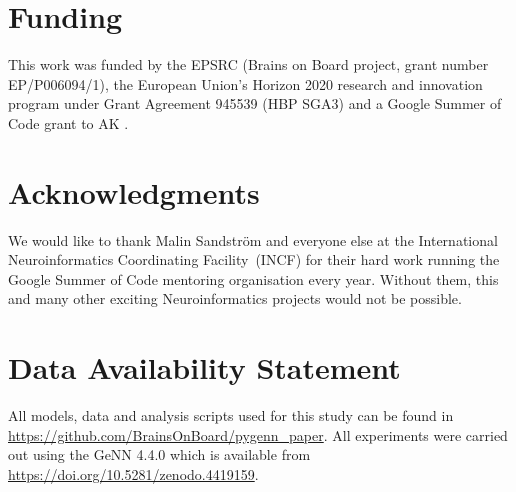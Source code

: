 \documentclass[utf8]{frontiersSCNS} %
\begin{document}
\section*{Funding}
This work was funded by the EPSRC (Brains on Board project, grant number EP/P006094/1), the
European Union’s Horizon 2020 research and innovation program under Grant Agreement 945539 (HBP SGA3) and a Google Summer of Code grant to AK .

\section*{Acknowledgments}
We would like to thank Malin Sandstr\"{o}m and everyone else at the International Neuroinformatics Coordinating Facility~(INCF) for their hard work running the Google Summer of Code mentoring organisation every year.
Without them, this and many other exciting Neuroinformatics projects would not be possible.

\section*{Data Availability Statement}
All models, data and analysis scripts used for this study can be found in \url{https://github.com/BrainsOnBoard/pygenn_paper}.
All experiments were carried out using the GeNN 4.4.0 which is available from \url{https://doi.org/10.5281/zenodo.4419159}.


\end{document}
